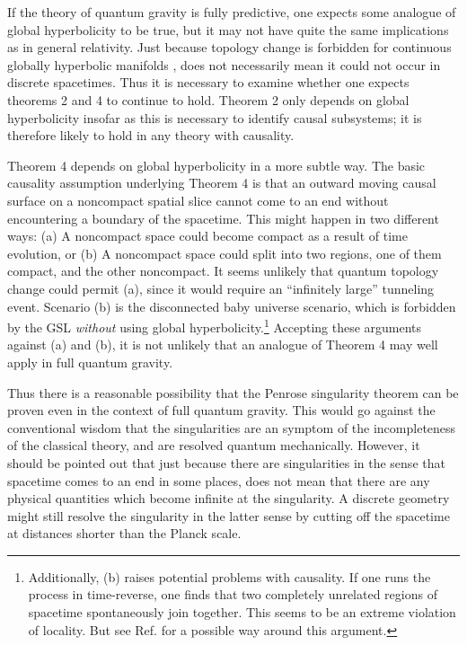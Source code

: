 \documentclass[12pt]{article}
\begin{document}
If the theory of quantum gravity is fully predictive, one expects some analogue of global hyperbolicity to be true, but it may not have quite the same implications as in general relativity.  Just because topology change is forbidden for continuous globally hyperbolic manifolds \cite{geroch}, does not necessarily mean it could not occur in discrete spacetimes.  Thus it is necessary to examine whether one expects theorems 2 and 4 to continue to hold.  Theorem 2 only depends on global hyperbolicity insofar as this is necessary to identify causal subsystems; it is therefore likely to hold in any theory with causality.

Theorem 4 depends on global hyperbolicity in a more subtle way.  The basic causality assumption underlying Theorem 4 is that an outward moving causal surface on a noncompact spatial slice cannot come to an end without encountering a boundary of the spacetime.  This might happen in two different ways: (a) A noncompact space could become compact as a result of time evolution, or (b) A noncompact space could split into two regions, one of them compact, and the other noncompact.  It seems unlikely that quantum topology change could permit (a), since it would require an ``infinitely large'' tunneling event.  Scenario (b) is the disconnected baby universe scenario, which is forbidden by the GSL \emph{without} using global hyperbolicity.\footnote{Additionally, (b) raises potential problems with causality. If one runs the process in time-reverse, one finds that two completely unrelated regions of spacetime spontaneously join together.  This seems to be an extreme violation of locality.  But see Ref. \cite{coleman} for a possible way around this argument.}  Accepting these arguments against (a) and (b), it is not unlikely that an analogue of Theorem 4 may well apply in full quantum gravity.

Thus there is a reasonable possibility that the Penrose singularity theorem can be proven even in the context of full quantum gravity.  This would go against the conventional wisdom that the singularities are an symptom of the incompleteness of the classical theory, and are resolved quantum mechanically.  However, it should be pointed out that just because there are singularities in the sense that spacetime comes to an end in some places, does not mean that there are any physical quantities which become infinite at the singularity.  A discrete geometry might still resolve the singularity in the latter sense by cutting off the spacetime at distances shorter than the Planck scale.
\end{document}
